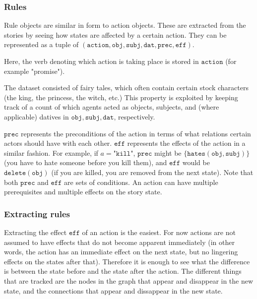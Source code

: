 \subsubsection{Rules}

Rule objects are similar in form to action objects. These are extracted from 
the stories by seeing how states are affected by a certain action.
They can be represented as a tuple of $(\texttt{action}, \texttt{obj}, \texttt{subj}, \texttt{dat},
\texttt{prec}, \texttt{eff})$.

Here, the verb denoting which action is taking place is stored in 
$\texttt{action}$ (for example "promise").

The dataset consisted of fairy tales, which often contain certain stock 
characters (the king, the princess, the witch, etc.)
This property is exploited by keeping track of a count of which agents
acted as objects, subjects, and (where applicable) datives in 
$\texttt{obj}, \texttt{subj}, \texttt{dat}$, respectively.

$\texttt{prec}$ represents the preconditions of the action in terms of what 
relations certain actors should have with each other.
$\texttt{eff}$ represents the effects of the action in a similar fashion.
For example, if $a = \texttt{"kill"}$, $\texttt{prec}$ might be 
$ \{\texttt{hates}(\texttt{obj}, \texttt{subj})\} $ (you have to hate someone 
before you kill them), and $\texttt{eff}$ would be ${\texttt{delete}(\texttt{obj})}$
(if you are killed, you are removed from the next state).
Note that both $\texttt{prec}$ and $\texttt{eff}$ are sets of conditions.
An action can have multiple prerequisites and multiple effects on the story state.

\subsubsection{Extracting rules}

Extracting the effect $\texttt{eff}$ of an action is the easiest. For now
actions are not assumed to have effects that do not become apparent immediately
(in other words, the action has an immediate effect on the next state, but no
lingering effects on the states after that).
Therefore it is enough to see what the difference is between the state before
and the state after the action. The different things that are tracked are the
nodes in the graph that appear and disappear in the new state, and the
connections that appear and dissappear in the new state.

